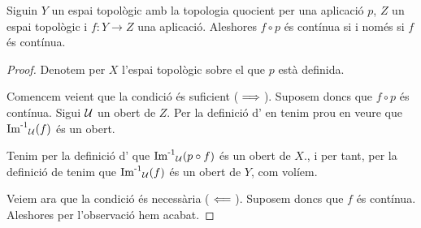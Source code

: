 \documentclass[../Apunts.tex]{subfiles}
\begin{document}
	\begin{theorem}
		\label{thm:la composició d'una aplicació amb l'aplicació que indueix la topologia en un espai quocient és contínua si i només si aquesta aplicació és contínua}
		Siguin \(Y\) un espai topològic amb la topologia quocient per una aplicació \(p\), \(Z\) un espai topològic i \(f\colon Y\longrightarrow Z\) una aplicació. Aleshores \(f\circ p\) és contínua si i només si \(f\) és contínua.
		\begin{proof}
			Denotem per \(X\) l'espai topològic sobre el que \(p\) està definida.
			
			Comencem veient que la condició és suficient (\(\implies\)). Suposem doncs que \(f\circ p\) és contínua. Sigui \(\mathcal{U}\) un obert de \(Z\). Per la definició d' en tenim prou en veure que \(\operatorname{\operatorname{Im}^{-1}}_{\mathcal{U}}(f)\) és un obert.
			
			Tenim per la definició d' que \(\operatorname{\operatorname{Im}^{-1}}_{\mathcal{U}}(p\circ f)\) és un obert de \(X\)., i per tant, per la definició de  tenim que \(\operatorname{\operatorname{Im}^{-1}}_{\mathcal{U}}(f)\) és un obert de \(Y\), com volíem.
			
			Veiem ara que la condició és necessària (\(\impliedby\)). Suposem doncs que \(f\) és contínua. Aleshores per l'observació  hem acabat.
		\end{proof}
	\end{theorem}
\end{document}
